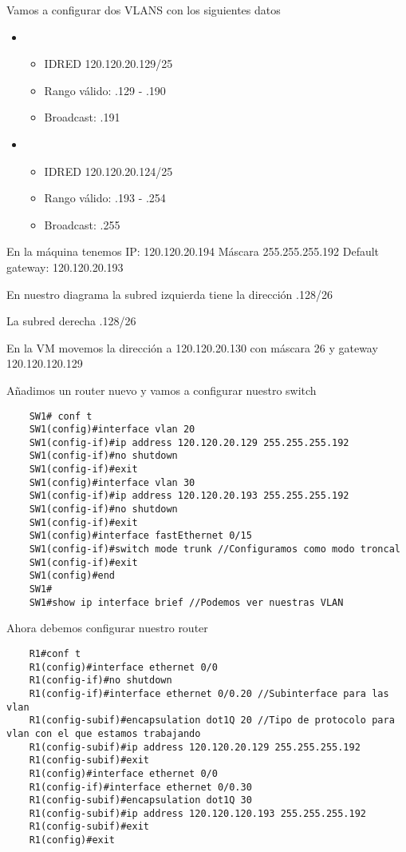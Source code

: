 Vamos a configurar dos VLANS con los siguientes datos 
\begin{itemize}
    \item {
        \begin{itemize}
            \item {IDRED 120.120.20.129/25}
            \item {Rango válido: .129 - .190}
            \item {Broadcast: .191}
        \end{itemize}
    }
    \item {
        \begin{itemize}
            \item {IDRED 120.120.20.124/25}
            \item {Rango válido: .193 - .254}
            \item {Broadcast: .255}
        \end{itemize}
    }
\end{itemize}

En la máquina tenemos \break
IP: 120.120.20.194 \break
Máscara 255.255.255.192 \break
Default gateway: 120.120.20.193 \break

En nuestro diagrama la subred izquierda tiene la dirección .128/26 \break 

La subred derecha .128/26 \break 

En la VM movemos la dirección a 120.120.20.130 con máscara 26 y gateway 120.120.120.129

Añadimos un router nuevo y vamos a configurar nuestro switch 

\begin{lstlisting}
    SW1# conf t
    SW1(config)#interface vlan 20 
    SW1(config-if)#ip address 120.120.20.129 255.255.255.192
    SW1(config-if)#no shutdown
    SW1(config-if)#exit
    SW1(config)#interface vlan 30
    SW1(config-if)#ip address 120.120.20.193 255.255.255.192
    SW1(config-if)#no shutdown 
    SW1(config-if)#exit 
    SW1(config)#interface fastEthernet 0/15 
    SW1(config-if)#switch mode trunk //Configuramos como modo troncal
    SW1(config-if)#exit 
    SW1(config)#end 
    SW1#
    SW1#show ip interface brief //Podemos ver nuestras VLAN
\end{lstlisting}

Ahora debemos configurar nuestro router 

\begin{lstlisting}
    R1#conf t
    R1(config)#interface ethernet 0/0
    R1(config-if)#no shutdown 
    R1(config-if)#interface ethernet 0/0.20 //Subinterface para las vlan 
    R1(config-subif)#encapsulation dot1Q 20 //Tipo de protocolo para vlan con el que estamos trabajando
    R1(config-subif)#ip address 120.120.20.129 255.255.255.192
    R1(config-subif)#exit 
    R1(config)#interface ethernet 0/0
    R1(config-if)#interface ethernet 0/0.30 
    R1(config-subif)#encapsulation dot1Q 30 
    R1(config-subif)#ip address 120.120.120.193 255.255.255.192
    R1(config-subif)#exit
    R1(config)#exit 
\end{lstlisting}

